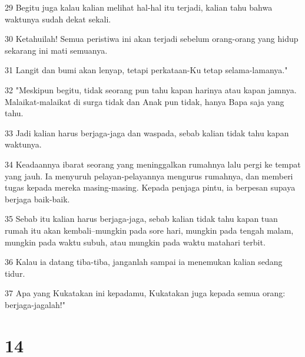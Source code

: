 \par 29 Begitu juga kalau kalian melihat hal-hal itu terjadi, kalian tahu bahwa waktunya sudah dekat sekali.
\par 30 Ketahuilah! Semua peristiwa ini akan terjadi sebelum orang-orang yang hidup sekarang ini mati semuanya.
\par 31 Langit dan bumi akan lenyap, tetapi perkataan-Ku tetap selama-lamanya."
\par 32 "Meskipun begitu, tidak seorang pun tahu kapan harinya atau kapan jamnya. Malaikat-malaikat di surga tidak dan Anak pun tidak, hanya Bapa saja yang tahu.
\par 33 Jadi kalian harus berjaga-jaga dan waspada, sebab kalian tidak tahu kapan waktunya.
\par 34 Keadaannya ibarat seorang yang meninggalkan rumahnya lalu pergi ke tempat yang jauh. Ia menyuruh pelayan-pelayannya mengurus rumahnya, dan memberi tugas kepada mereka masing-masing. Kepada penjaga pintu, ia berpesan supaya berjaga baik-baik.
\par 35 Sebab itu kalian harus berjaga-jaga, sebab kalian tidak tahu kapan tuan rumah itu akan kembali--mungkin pada sore hari, mungkin pada tengah malam, mungkin pada waktu subuh, atau mungkin pada waktu matahari terbit.
\par 36 Kalau ia datang tiba-tiba, janganlah sampai ia menemukan kalian sedang tidur.
\par 37 Apa yang Kukatakan ini kepadamu, Kukatakan juga kepada semua orang: berjaga-jagalah!"

\chapter{14}

